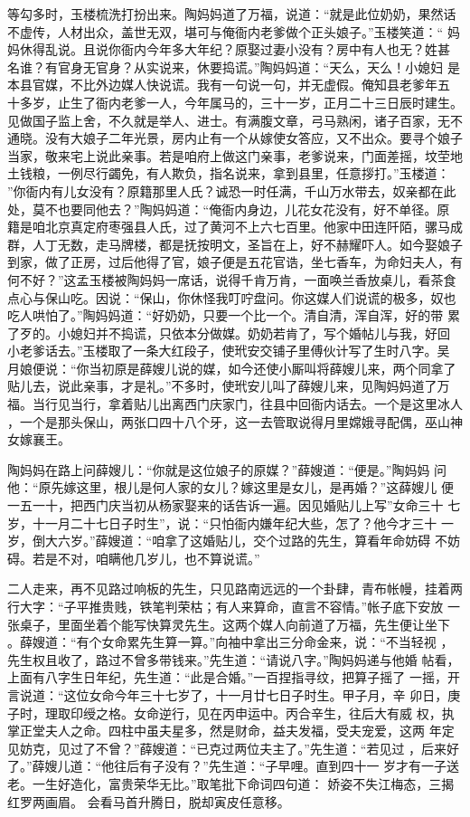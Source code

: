 等勾多时，玉楼梳洗打扮出来。陶妈妈道了万福，说道：“就是此位奶奶，果然话
不虚传，人材出众，盖世无双，堪可与俺衙内老爹做个正头娘子。”玉楼笑道：“
妈妈休得乱说。且说你衙内今年多大年纪？原娶过妻小没有？房中有人也无？姓甚
名谁？有官身无官身？从实说来，休要捣谎。”陶妈妈道：“天么，天么！小媳妇
是本县官媒，不比外边媒人快说谎。我有一句说一句，并无虚假。俺知县老爹年五
十多岁，止生了衙内老爹一人，今年属马的，三十一岁，正月二十三日辰时建生。
见做国子监上舍，不久就是举人、进士。有满腹文章，弓马熟闲，诸子百家，无不
通晓。没有大娘子二年光景，房内止有一个从嫁使女答应，又不出众。要寻个娘子
当家，敬来宅上说此亲事。若是咱府上做这门亲事，老爹说来，门面差摇，坟茔地
土钱粮，一例尽行蠲免，有人欺负，指名说来，拿到县里，任意拶打。”玉楼道：
”你衙内有儿女没有？原籍那里人氏？诚恐一时任满，千山万水带去，奴亲都在此
处，莫不也要同他去？”陶妈妈道：“俺衙内身边，儿花女花没有，好不单径。原
籍是咱北京真定府枣强县人氏，过了黄河不上六七百里。他家中田连阡陌，骡马成
群，人丁无数，走马牌楼，都是抚按明文，圣旨在上，好不赫耀吓人。如今娶娘子
到家，做了正房，过后他得了官，娘子便是五花官诰，坐七香车，为命妇夫人，有
何不好？”这孟玉楼被陶妈妈一席话，说得千肯万肯，一面唤兰香放桌儿，看茶食
点心与保山吃。因说：“保山，你休怪我叮咛盘问。你这媒人们说谎的极多，奴也
吃人哄怕了。”陶妈妈道：“好奶奶，只要一个比一个。清自清，浑自浑，好的带
累了歹的。小媳妇并不捣谎，只依本分做媒。奶奶若肯了，写个婚帖儿与我，好回
小老爹话去。”玉楼取了一条大红段子，使玳安交铺子里傅伙计写了生时八字。吴
月娘便说：“你当初原是薛嫂儿说的媒，如今还使小厮叫将薛嫂儿来，两个同拿了
贴儿去，说此亲事，才是礼。”不多时，使玳安儿叫了薛嫂儿来，见陶妈妈道了万
福。当行见当行，拿着贴儿出离西门庆家门，往县中回衙内话去。一个是这里冰人
，一个是那头保山，两张口四十八个牙，这一去管取说得月里嫦娥寻配偶，巫山神
女嫁襄王。

陶妈妈在路上问薛嫂儿：“你就是这位娘子的原媒？”薛嫂道：“便是。”陶妈妈
问他：“原先嫁这里，根儿是何人家的女儿？嫁这里是女儿，是再婚？”这薛嫂儿
便一五一十，把西门庆当初从杨家娶来的话告诉一遍。因见婚贴儿上写”女命三十
七岁，十一月二十七日子时生”，说：“只怕衙内嫌年纪大些，怎了？他今才三十
一岁，倒大六岁。”薛嫂道：“咱拿了这婚贴儿，交个过路的先生，算看年命妨碍
不妨碍。若是不对，咱瞒他几岁儿，也不算说谎。”

二人走来，再不见路过响板的先生，只见路南远远的一个卦肆，青布帐幔，挂着两
行大字：“子平推贵贱，铁笔判荣枯；有人来算命，直言不容情。”帐子底下安放
一张桌子，里面坐着个能写快算灵先生。这两个媒人向前道了万福，先生便让坐下
。薛嫂道：“有个女命累先生算一算。”向袖中拿出三分命金来，说：“不当轻视
，先生权且收了，路过不曾多带钱来。”先生道：“请说八字。”陶妈妈递与他婚
帖看，上面有八字生日年纪，先生道：“此是合婚。”一百捏指寻纹，把算子摇了
一摇，开言说道：“这位女命今年三十七岁了，十一月廿七日子时生。甲子月，辛
卯日，庚子时，理取印绶之格。女命逆行，见在丙申运中。丙合辛生，往后大有威
权，执掌正堂夫人之命。四柱中虽夫星多，然是财命，益夫发福，受夫宠爱，这两
年定见妨克，见过了不曾？”薛嫂道：“已克过两位夫主了。”先生道：“若见过
，后来好了。”薛嫂儿道：“他往后有子没有？”先生道：“子早哩。直到四十一
岁才有一子送老。一生好造化，富贵荣华无比。”取笔批下命词四句道：
娇姿不失江梅态，三揭红罗两画眉。
会看马首升腾日，脱却寅皮任意移。

